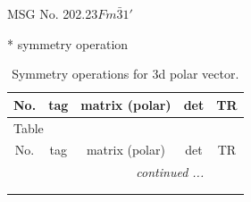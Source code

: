 \documentclass[fleqn,8pt]{jsarticle}
\begin{document}
\setcounter{MaxMatrixCols}{32}

\renewcommand{\tablename}{Table~}
\renewcommand{\figurename}{Figure~}
\begin{center}
\LARGE
MSG No. 202.23\quad$Fm\bar{3}1'$
\end{center}
* symmetry operation
\renewcommand{\arraystretch}{1.3}
\begin{longtable}{ccccc}
\caption{Symmetry operations for 3d polar vector.}
 \\
 \hline \hline
No. & tag & matrix (polar) & det & TR \\ \hline \endfirsthead

\multicolumn{4}{l}{\tablename\ \thetable{}} \\
 \hline \hline
No. & tag & matrix (polar) & det & TR \\ \hline \endhead

 \hline \hline
\multicolumn{4}{r}{\footnotesize\it continued ...} \\ \endfoot

 \hline \hline
\multicolumn{4}{r}{} \\ \endlastfoot


\end{longtable}
\end{document}
